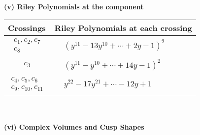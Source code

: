 \documentclass[1p]{elsarticle_modified}
\theoremstyle{definition}
\begin{document}
\newpage\renewcommand{\arraystretch}{1}
\flushleft \textbf{(v) Riley Polynomials at the component}\newline \\
\begin{tabular}{m{50pt}|m{274pt}}
Crossings & \hspace{64pt}Riley Polynomials at each crossing \\
\hline $$\begin{aligned}c_{1},c_{2},c_{7}\\c_{8}\end{aligned}$$&$\begin{aligned}
&(y^{11}-13 y^{10}+\cdots+2 y-1)^{2}
\end{aligned}$\\
\hline $$\begin{aligned}c_{3}\end{aligned}$$&$\begin{aligned}
&(y^{11}- y^{10}+\cdots+14 y-1)^{2}
\end{aligned}$\\
\hline $$\begin{aligned}c_{4},c_{5},c_{6}\\c_{9},c_{10},c_{11}\end{aligned}$$&$\begin{aligned}
&y^{22}-17 y^{21}+\cdots-12 y+1
\end{aligned}$\\
\hline
\end{tabular}\\~\\
\newpage\flushleft \textbf{(vi) Complex Volumes and Cusp Shapes}
\end{document}
